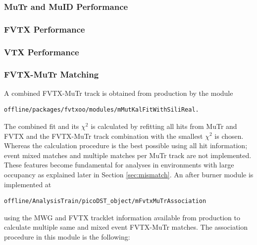 \documentclass[12pt]{article}
\begin{document}
\subsubsection{MuTr and MuID Performance}

\subsubsection{FVTX Performance}

\subsubsection{VTX Performance}


\subsubsection{FVTX-MuTr Matching}
\label{sec:matching}

A combined FVTX-MuTr track is obtained from production by the module

\begin{verbatim}
offline/packages/fvtxoo/modules/mMutKalFitWithSiliReal.
\end{verbatim}

The combined fit and its $\chi^2$ is calculated by refitting all hits from MuTr and FVTX and the FVTX-MuTr track combination with the smallest $\chi^2$ is chosen. Whereas the calculation 
procedure is the best possible using all hit information; event mixed matches and multiple matches per MuTr track are not implemented. These features become fundamental for analyses in 
environments with large occupancy as explained later in Section \ref{sec:mismatch}. An after burner module is implemented at

\begin{verbatim}
offline/AnalysisTrain/picoDST_object/mFvtxMuTrAssociation
\end{verbatim}

\noindent using the MWG and FVTX tracklet information available from production to calculate multiple same and mixed event FVTX-MuTr matches. 
The association procedure in this module is the following:
\end{document}
